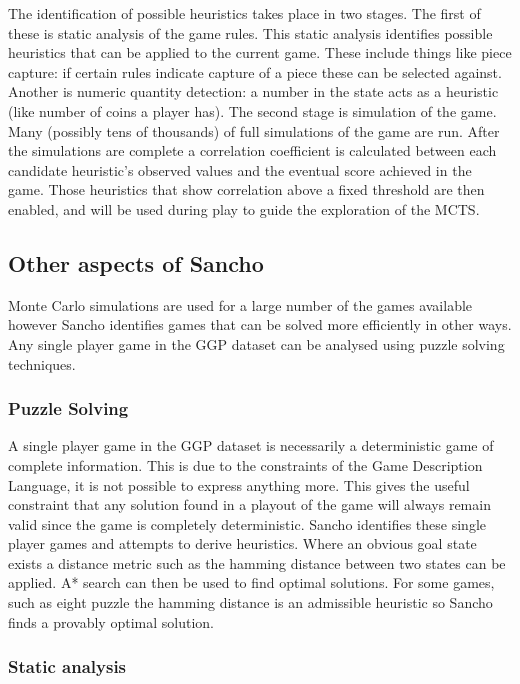 The identification of possible heuristics takes place in two stages. The first of these is static analysis of the game rules. This static analysis identifies possible heuristics that can be applied to the current game. These include things like piece capture: if certain rules indicate capture of a piece these can be selected against. Another is numeric quantity detection: a number in the state acts as a heuristic (like number of coins a player has). The second stage is simulation of the game. Many (possibly tens of thousands) of full simulations of the game are run. After the simulations are complete a correlation coefficient is calculated between each candidate heuristic's observed values and the eventual score achieved in the game. Those heuristics that show correlation above a fixed threshold are then enabled, and will be used during play to guide the exploration of the MCTS.

\subsection{Other aspects of Sancho}

Monte Carlo simulations are used for a large number of the games available however Sancho identifies games that can be solved more efficiently in other ways. Any single player game in the GGP dataset can be analysed using puzzle solving techniques.
\subsubsection{Puzzle Solving}
A single player game in the GGP dataset is necessarily a deterministic game of complete information. This is due to the constraints of the Game Description Language, it is not possible to express anything more. This gives the useful constraint that any solution found in a playout of the game will always remain valid since the game is completely deterministic. Sancho identifies these single player games and attempts to derive heuristics. Where an obvious goal state exists a distance metric such as the hamming distance between two states can be applied. A* search can then be used to find optimal solutions. For some games, such as eight puzzle the hamming distance is an admissible heuristic so Sancho finds a provably optimal solution.

\subsubsection{Static analysis}

